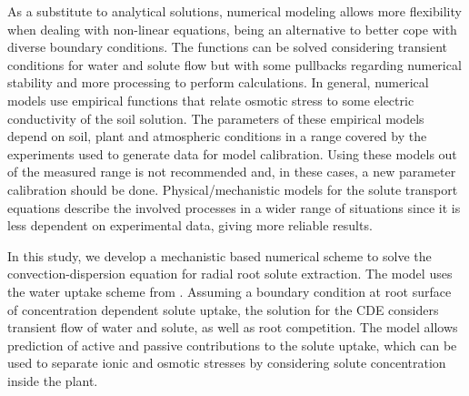 As a substitute to analytical solutions, numerical modeling allows more flexibility when dealing with non-linear equations, being an alternative to better cope with diverse boundary conditions. 
The functions can be solved considering transient conditions for water and solute flow but with some pullbacks regarding numerical stability and more processing to perform calculations.
In general, numerical models use empirical functions that relate osmotic stress to some electric conductivity of the soil solution. 
The parameters of these empirical models depend on soil, plant and atmospheric conditions in a range covered by the experiments used to generate data for model calibration. 
Using these models out of the measured range is not recommended and, in these cases, a new parameter calibration should be done.
Physical/mechanistic models for the solute transport equations describe the involved processes in a wider range of situations since it is less dependent on experimental data, giving more reliable results.


In this study, we develop a mechanistic based numerical scheme to solve the convection-dispersion equation for radial root solute extraction.
The model uses the water uptake scheme from \cite{lierwater}.
Assuming a boundary condition at root surface of concentration dependent solute uptake, the solution for the CDE considers transient flow of water and solute, as well as root competition.
The model allows prediction of active and passive contributions to the solute uptake, which can be used to separate ionic and osmotic stresses by considering solute concentration inside the plant.
